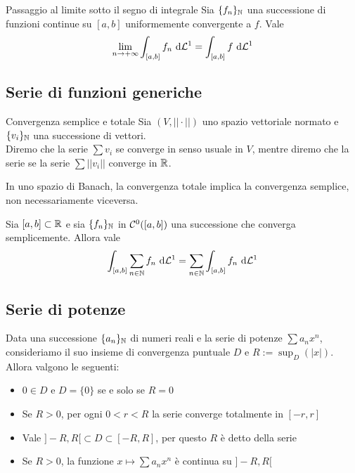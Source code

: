 \documentclass{article}
\begin{document}
\begin{proposition}{Passaggio al limite sotto il segno di integrale}{}
    Sia $\{f_n\}_{\mathbb{N}}$ una successione di funzioni continue su $[a,b]$ uniformemente convergente a $f$. Vale
    \[\lim_{n\to+\infty}\int_{[a,b]}f_n \text{ d} \mathcal{L}^1 = \int_{[a,b]} f \text{ d} \mathcal{L}^1\]
\end{proposition}

\subsection{Serie di funzioni generiche}

\begin{definition}{Convergenza semplice e totale}{}
    Sia $(V,||\cdot||)$ uno spazio vettoriale normato e $\{v_i\}_{\mathbb{N}}$ una successione di vettori.\\
    Diremo che la serie $\sum v_i$  se converge in senso usuale in $V$, mentre diremo che la serie  se la serie $\sum ||v_i||$ converge in $\mathbb{R}$.
\end{definition}

\begin{remark}{}{}
    In uno spazio di Banach, la convergenza totale implica la convergenza semplice, non necessariamente viceversa.
\end{remark}

\begin{proposition}{}{}
    Sia $[a,b]\subset \mathbb{R}$ e sia $\{f_n\}_{\mathbb{N}}$ in $\mathcal{C}^0([a,b])$ una successione che converga semplicemente. Allora vale
    \[\int_{[a,b]} \sum_{n\in\mathbb{N}} f_n \text{ d} \mathcal{L}^1 =\sum_{n\in\mathbb{N}}  \int_{[a,b]} f_n \text{ d} \mathcal{L}^1\]
\end{proposition}

\subsection{Serie di potenze}

\begin{proposition}{}{}
    Data una successione $\{a_n\}_{\mathbb{N}}$ di numeri reali e la serie di potenze $\sum a_n x^n$, consideriamo il suo insieme di convergenza puntuale $D$ e $R:=\sup_D(|x|)$. Allora valgono le seguenti:\begin{itemize}
        \item $0 \in D$ e $D = \{0\}$ se e solo se $R=0$
        \item Se $R>0$, per ogni $0<r<R$ la serie converge totalmente in $[-r,r]$
        \item Vale $]-R,R[ \subset D \subset [-R,R]$, per questo $R$ è detto  della serie
        \item Se $R>0$, la funzione $x\mapsto \sum a_nx^n$ è continua su $]-R,R[$
    \end{itemize}
\end{proposition}
\end{document}
